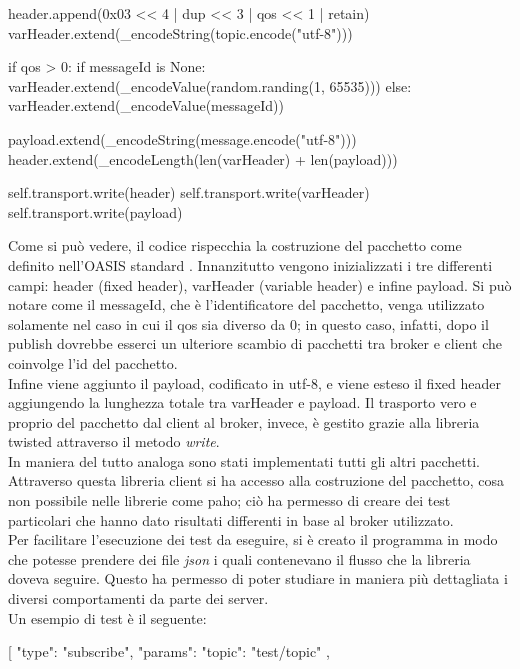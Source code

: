 \documentclass[binding=0.6cm,TFA]{sapthesis}
\begin{document}
\begin{large}
\begin{python}
    header.append(0x03 << 4 | dup << 3 | qos << 1 | retain)
    varHeader.extend(_encodeString(topic.encode("utf-8")))
    
    if qos > 0:
    	if messageId is None:
    		varHeader.extend(_encodeValue(random.randing(1, 65535)))
    	else:
    		varHeader.extend(_encodeValue(messageId))
    
    payload.extend(_encodeString(message.encode("utf-8")))
    header.extend(_encodeLength(len(varHeader) + len(payload)))
    
    self.transport.write(header)
    self.transport.write(varHeader)
    self.transport.write(payload)
\end{python}

Come si può vedere, il codice rispecchia la costruzione del pacchetto come definito nell'OASIS standard \cite{oasis:publish}. Innanzitutto vengono inizializzati i tre differenti campi: header (fixed header), varHeader (variable header) e infine payload. Si può notare come il messageId, che è l'identificatore del pacchetto, venga utilizzato solamente nel caso in cui il qos sia diverso da 0; in questo caso, infatti, dopo il publish dovrebbe esserci un ulteriore scambio di pacchetti tra broker e client che coinvolge l'id del pacchetto. \\
Infine viene aggiunto il payload, codificato in utf-8, e viene esteso il fixed header aggiungendo la lunghezza totale tra varHeader e payload. Il trasporto vero e proprio del pacchetto dal client al broker, invece, è gestito grazie alla libreria twisted attraverso il metodo \textit{write}. \\

In maniera del tutto analoga sono stati implementati tutti gli altri pacchetti. Attraverso questa libreria client si ha accesso alla costruzione del pacchetto, cosa non possibile nelle librerie come paho; ciò ha permesso di creare dei test particolari che hanno dato risultati differenti in base al broker utilizzato. \\

Per facilitare l'esecuzione dei test da eseguire, si è creato il programma in modo che potesse prendere dei file \textit{json} i quali contenevano il flusso che la libreria doveva seguire. Questo ha permesso di poter studiare in maniera più dettagliata i diversi comportamenti da parte dei server. \\
Un esempio di test è il seguente:
\begin{python}
[   
    {
       "type": "subscribe",
       "params": {
           "topic": "test/topic"
       }     
    },


\end{python}
\end{large}
\end{document}

